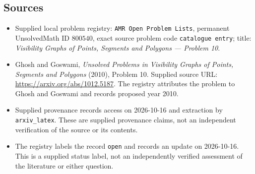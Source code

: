 \documentclass[11pt]{article}
\begin{document}
\subsection{Sources}
\begin{itemize}
\item Supplied local problem registry: \texttt{AMR Open Problem Lists}, permanent UnsolvedMath ID \(800540\), exact source problem code \texttt{catalogue entry}; title: \emph{Visibility Graphs of Points, Segments and Polygons --- Problem 10}.
\item Ghosh and Goswami, \emph{Unsolved Problems in Visibility Graphs of Points, Segments and Polygons} (2010), Problem 10. Supplied source URL: \url{https://arxiv.org/abs/1012.5187}. The registry attributes the problem to Ghosh and Goswami and records proposed year 2010.
\item Supplied provenance records access on 2026-10-16 and extraction by \texttt{arxiv\_latex}. These are supplied provenance claims, not an independent verification of the source or its contents.
\item The registry labels the record \texttt{open} and records an update on 2026-10-16. This is a supplied status label, not an independently verified assessment of the literature or either question.
\end{itemize}
\end{document}
